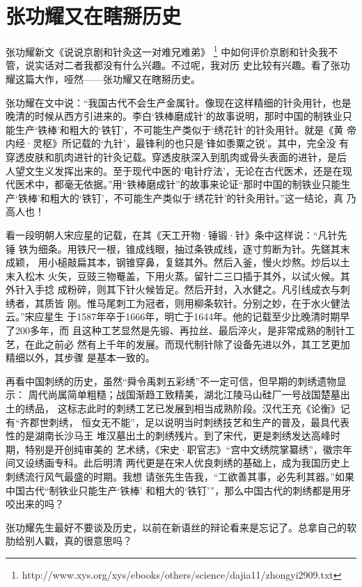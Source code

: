 \chapter{张功耀又在瞎掰历史}

张功耀新文《说说京剧和针灸这一对难兄难弟》
\footnote{http://www.xys.org/xys/ebooks/others/science/dajia11/zhongyi2909.txt}
中如何评价京剧和针灸我不管，说实话对二者我都没有什么兴趣。不过呢，我对历
史比较有兴趣。看了张功耀这篇大作，哑然——张功耀又在瞎掰历史。

张功耀在文中说：“我国古代不会生产金属针。像现在这样精细的针灸用针，也是
晚清的时候从西方引进来的。李白‘铁棒磨成针’的故事说明，那时中国的制铁业只
能生产‘铁棒’和粗大的‘铁钉’，不可能生产类似于‘绣花针’的针灸用针。就是《黄
帝内经·灵枢》所记载的‘九针’，最锋利的也只是‘锋如黍粟之锐’。其中，完全没
有穿透皮肤和肌肉进针的针灸记载。穿透皮肤深入到肌肉或骨头表面的进针，是后
人望文生义发挥出来的。至于现代中医的‘电针疗法’，无论在古代医术，还是在现
代医术中，都毫无依据。”用“铁棒磨成针”的故事来论证“那时中国的制铁业只能生
产‘铁棒’和粗大的‘铁钉’，不可能生产类似于‘绣花针’的针灸用针。”这一结论，真
乃高人也！

看一段明朝人宋应星的记载，在其《天工开物·锤锻·针》条中这样说：“凡针先锤
铁为细条。用铁尺一根，锥成线眼，抽过条铁成线，逐寸剪断为针。先鎈其末成颖，
用小槌敲扁其本，钢锥穿鼻，复鎈其外。然后入釜，慢火炒熬。炒后以土末入松木
火矢，豆豉三物罨盖，下用火蒸。留针二三口插于其外，以试火候。其外针入手捻
成粉碎，则其下针火候皆足。然后开封，入水健之。凡引线成衣与刺绣者，其质皆
刚。惟马尾刺工为冠者，则用柳条软针。分别之妙，在于水火健法云。”宋应星生
于1587年卒于1666年，明亡于1644年。他的记载至少比晚清时期早了200多年，而
且这种工艺显然是先锻、再拉丝、最后淬火，是非常成熟的制针工艺，在此之前必
然有上千年的发展。而现代制针除了设备先进以外，其工艺更加精细以外，其步骤
是基本一致的。

再看中国刺绣的历史，虽然“舜令禹刺五彩绣”不一定可信，但早期的刺绣遗物显示：
周代尚属简单粗糙；战国渐趋工致精美，湖北江陵马山硅厂一号战国楚墓出土的绣品，
这标志此时的刺绣工艺已发展到相当成熟阶段。汉代王充《论衡》记有“齐郡世刺绣，
恒女无不能”，足以说明当时刺绣技艺和生产的普及，最具代表性的是湖南长沙马王
堆汉墓出土的刺绣残片。到了宋代，更是刺绣发达高峰时期，特别是开创纯审美的
艺术绣，《宋史·职官志》“宫中文绣院掌纂绣”，徽宗年间又设绣画专科。此后明清
两代更是在宋人优良刺绣的基础上，成为我国历史上刺绣流行风气最盛的时期。我想
请张先生告我，“工欲善其事，必先利其器。”如果中国古代“制铁业只能生产‘铁棒’
和粗大的‘铁钉’”，那么中国古代的刺绣都是用牙咬出来的吗？

张功耀先生最好不要谈及历史，以前在新语丝的辩论看来是忘记了。总拿自己的软
肋给别人戳，真的很意思吗？
